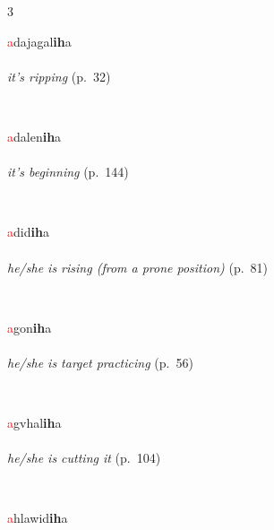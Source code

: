 \documentclass[oneside,openany]{book}%
\begin{document}
\noindent\begin{multicols}{3}%
\begin{minipage}[t]{\linewidth}
\raggedright\noindent \textcolor{Red}{a}dajagal\textbf{ih}a\\
\\
\noindent \textit{it's ripping} (p.~32)
\end{minipage}\\[1em]%
\begin{minipage}[t]{\linewidth}
\raggedright\noindent \textcolor{Red}{a}dalen\textbf{ih}a\\
\\
\noindent \textit{it's beginning} (p.~144)
\end{minipage}\\[1em]%
\begin{minipage}[t]{\linewidth}
\raggedright\noindent \textcolor{Red}{a}did\textbf{ih}a\\
\\
\noindent \textit{he/she is rising (from a prone position)} (p.~81)
\end{minipage}\\[1em]%
\begin{minipage}[t]{\linewidth}
\raggedright\noindent \textcolor{Red}{a}gon\textbf{ih}a\\
\\
\noindent \textit{he/she is target practicing} (p.~56)
\end{minipage}\\[1em]%
\begin{minipage}[t]{\linewidth}
\raggedright\noindent \textcolor{Red}{a}gvhal\textbf{ih}a\\
\\
\noindent \textit{he/she is cutting it} (p.~104)
\end{minipage}\\[1em]%
\begin{minipage}[t]{\linewidth}
\raggedright\noindent \textcolor{Red}{a}hlawid\textbf{ih}a\\
\\

\end{minipage}
\end{multicols}
\end{document}
